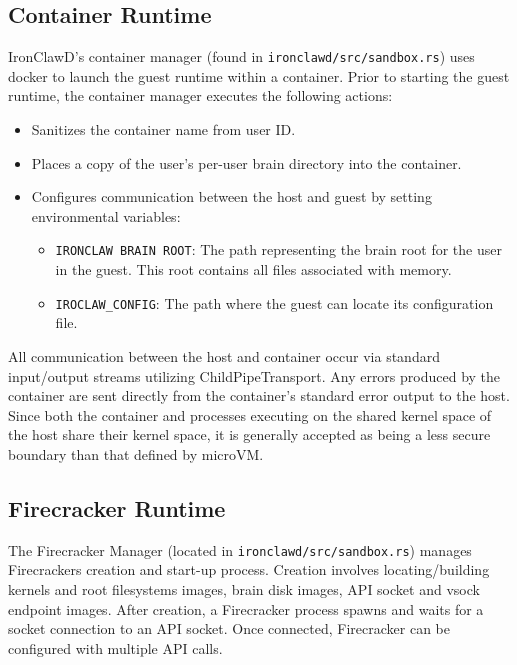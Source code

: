\subsection{Container Runtime}
IronClawD’s container manager (found in
\texttt{ironclawd/src/sandbox.rs}) uses docker to launch the guest runtime within
a container. Prior to starting the guest runtime, the container manager executes
the following actions:
\begin{itemize}
    \item Sanitizes the container name from user ID.
    \item Places a copy of the user's per-user brain directory into the container.
    \item Configures communication between the host and guest by setting
    environmental variables:
    \begin{itemize}
        \item \texttt{IRONCLAW BRAIN ROOT}: The path representing the brain root
        for the user in the guest. This root contains all files associated with
        memory.
        \item \texttt{IROCLAW\_CONFIG}: The path where the guest can locate its
        configuration file.
    \end{itemize}
\end{itemize}

All communication between the host and container occur via standard input/output
streams utilizing ChildPipeTransport. Any errors produced by the container are
sent directly from the container's standard error output to the host. Since both
the container and processes executing on the shared kernel space of the host
share their kernel space, it is generally accepted as being a less secure
boundary than that defined by microVM.

\subsection{Firecracker Runtime}
The Firecracker Manager (located in \texttt{ironclawd/src/sandbox.rs}) manages
Firecrackers creation and start-up process. Creation involves locating/building
kernels and root filesystems images, brain disk images, API socket and vsock
endpoint images. After creation, a Firecracker process spawns and waits for a
socket connection to an API socket. Once connected, Firecracker can be configured
with multiple API calls.

